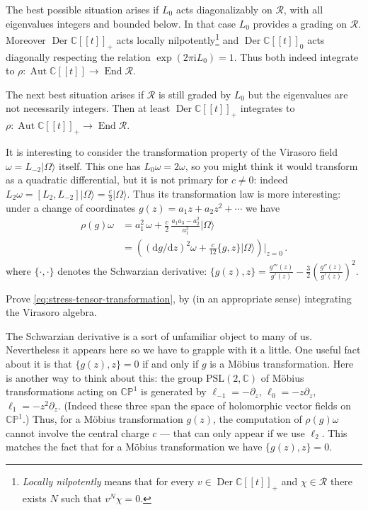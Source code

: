 \documentclass[12pt,letterpaper,reqno]{amsart}
\numberwithin{equation}{section}
\newcommand{\Derdisc}{\ensuremath{\Der \bbC[[t]]}}
\newcommand{\Autdisc}{\ensuremath{\Aut \bbC[[t]]}}
\newcommand{\bbC}{\ensuremath{\mathbb C}}
\newcommand{\bbP}{\ensuremath{\mathbb P}}
\newcommand{\I}{{\mathrm i}}
\newcommand\vac{{|\Omega\rangle}}
\newcommand{\de}{\mathrm{d}}
\newcommand{\PSL}{\mathrm{PSL}}
\newcommand{\vrep}{\mathcal{R}}
\newcommand{\ti}[1]{\textit{#1}}
\DeclareMathOperator{\End}{End}
\DeclareMathOperator{\Aut}{Aut}
\DeclareMathOperator{\Der}{Der}
\begin{document}
The best possible situation arises if $L_0$ acts diagonalizably on $\vrep$,
with all eigenvalues integers and bounded below. 
In that case $L_0$ provides a grading on $\vrep$. Moreover
$\Derdisc_+$ acts locally nilpotently\footnote{\ti{Locally nilpotently} means that for every $v \in \Derdisc_+$ and $\chi \in \vrep$ there exists $N$ such that $v^N \chi = 0$.} and $\Derdisc_0$
acts diagonally respecting the relation $\exp(2 \pi \I L_0) = 1$.
Thus both indeed integrate to $\rho: \Autdisc \to \End \vrep$.

The next best situation arises if $\vrep$ is still graded by $L_0$ but 
the eigenvalues are not necessarily integers. Then at least $\Derdisc_+$ integrates
to $\rho: \Autdisc_+ \to \End \vrep$.

It is interesting to consider the transformation property of the Virasoro field $\omega = L_{-2} \vac$ 
itself. This one has $L_0 \omega = 2 \omega$, so you might think it would transform as a 
quadratic differential, but it is not primary for $c \neq 0$: 
indeed $L_2 \omega = [L_2, L_{-2}] \vac = \frac{c}{2} \vac$.
Thus its transformation law is more interesting: under a change of coordinates $g(z) = a_1 z + a_2 z^2 + \cdots$ we have
\begin{align} \label{eq:stress-tensor-transformation}
  \rho(g) \omega &=  a_1^2\,\omega + \frac{c}{2}\,\frac{a_1a_3-a_2^2}{a_1^2} \vac \\
 &= \left( (\de g/\de z)^2 \omega + \frac{c}{12} \{g,z\} \vac \right) \vert_{z=0} \, .
\end{align}
where $\{\cdot,\cdot\}$ denotes the Schwarzian derivative:
$\{g(z),z\} = \frac{g'''(z)}{g'(z)} - \frac32 \left( \frac{g''(z)}{g'(z)} \right)^2$.

\begin{exercise}
Prove \eqref{eq:stress-tensor-transformation}, by (in an appropriate sense) integrating the Virasoro algebra.
\end{exercise}

The Schwarzian derivative is a sort of unfamiliar object to many of us. Nevertheless it appears here
so we have to grapple with it a little. One useful fact about it is that $\{g(z), z\} = 0$ if and only if $g$
is a M\"obius transformation. Here is another way to think about this: 
the group $\PSL(2,\bbC)$ of M\"obius transformations acting on $\bbC \bbP^1$ is
generated by $\ell_{-1} = - \partial_z$, $\ell_0 = -z \partial_z$, $\ell_1 = -z^2 \partial_z$.
(Indeed these three span the space of holomorphic vector fields on $\bbC \bbP^1$.)
Thus, for a M\"obius transformation $g(z)$, the computation of $\rho(g) \omega$ cannot involve
the central charge $c$ --- that can only appear if we use $\ell_2$. This matches the fact that
for a M\"obius transformation we have $\{g(z), z\} = 0$.
\end{document}

